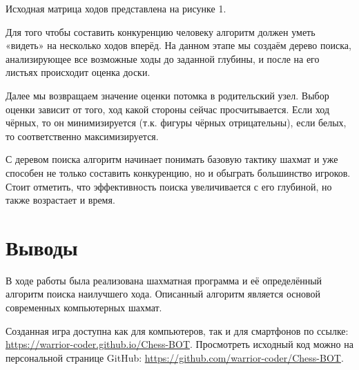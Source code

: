 \documentclass[a4paper,11pt,twoside]{article}
\begin{document}
\begin{multicols}{2}
Исходная матрица ходов представлена на рисунке 1.

\vspace{-10pt}

Для того чтобы составить конкуренцию человеку алгоритм должен уметь «видеть» на несколько ходов вперёд. На данном этапе мы создаём дерево поиска, анализирующее все возможные ходы до заданной глубины, и после на его листьях происходит оценка доски.

Далее мы возвращаем значение оценки потомка в родительский узел. Выбор оценки зависит от того, ход какой стороны сейчас просчитывается. Если ход чёрных, то он минимизируется (т.к. фигуры чёрных отрицательны), если белых, то соответственно максимизируется.

С деревом поиска алгоритм начинает понимать базовую тактику шахмат и уже способен не только составить конкуренцию, но и обыграть большинство игроков. Стоит отметить, что эффективность поиска увеличивается с его глубиной, но также возрастает и время. 
% 
\section{Выводы}\vspace{-10pt}
В ходе работы была реализована шахматная программа и её определённый алгоритм поиска наилучшего хода. Описанный алгоритм является основой современных компьютерных шахмат.

Созданная игра доступна как для компьютеров, так и для смартфонов по ссылке: \textcolor{blue}{\url{https://warrior-coder.github.io/Chess-BOT}}. Просмотреть исходный код можно на персональной странице GitHub: \textcolor{blue}{\url{https://github.com/warrior-coder/Chess-BOT}}.

\end{multicols}
%

%
\end{document}
